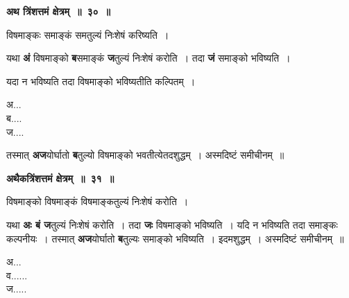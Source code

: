 \documentclass[11pt, openany]{book}
\begin{document}
\newpage
 \begin{center} 
\textbf{\large अथ त्रिंशत्तमं क्षेत्रम्~॥~३०~॥}
\end{center}

{\ab  विषमाङ्कः समाङ्कं समतुल्यं निःशेषं करिष्यति~। }

\begin{flushleft}
\begin{minipage}[t]{0.72\textwidth}
\hspace{4mm}  यथा \textbf{अं} विषमाङ्को \textbf{ब}समाङ्कं \textbf{ज}तुल्यं निःशेषं करोति~। तदा \textbf{जं} समाङ्को  भविष्यति~। \\
\vspace{-2mm}

\hspace{4mm} यदा न भविष्यति तदा विषमाङ्को भविष्यतीति कल्पितम्~।
\end{minipage} 
\hfill
\begin{minipage}[t]{0.18\textwidth}
अ...\\
ब.... \\
ज.... 
\end{minipage}
\end{flushleft}
\vspace{-3mm}

\noindent  तस्मात् \textbf{अज}योर्घातो \textbf{ब}तुल्यो विषमाङ्को भवतीत्येतदशुद्धम्~। अस्मदिष्टं समीचीनम्~॥
\vspace{2mm}

\begin{center}
\textbf{\large अथैकत्रिंशत्तमं क्षेत्रम्~॥~३१~॥}
\end{center}

{\ab  विषमाङ्को विषमाङ्कं विषमाङ्कतुल्यं निःशेषं करोति~। }

\begin{flushleft}
\begin{minipage}[t]{0.75\textwidth}
\hspace{4mm}  यथा \textbf{अः बं ज}तुल्यं निःशेषं करोति~। तदा \textbf{जः} विषमाङ्को भविष्यति~। यदि न भविष्यति तदा समाङ्कः कल्पनीयः~। तस्मात्  \textbf{अज}योर्घातो \textbf{ब}तुल्यः समाङ्को भविष्यति~। इदमशुद्धम्~। अस्मदिष्टं समीचीनम्~॥
\end{minipage} 
\hfill
\begin{minipage}[t]{0.15\textwidth}
अ...\\
व...... \\
ज..... 
\end{minipage}
\end{flushleft}
\vspace{-1mm}
\end{document}
